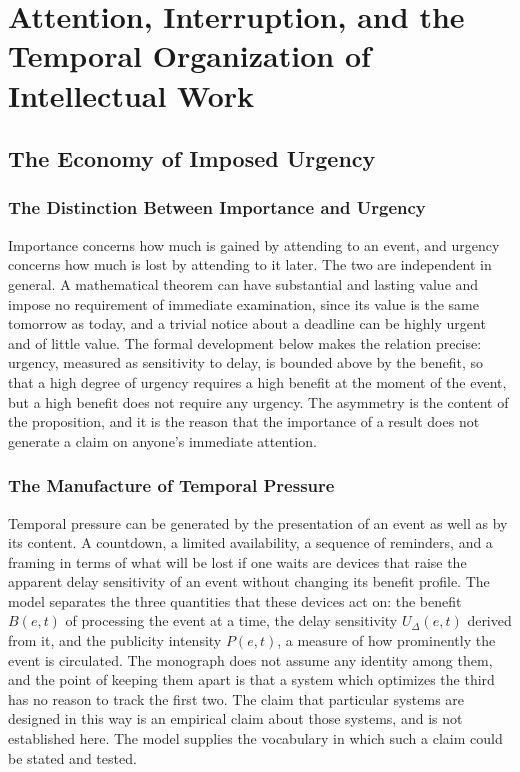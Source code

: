 \documentclass[11pt,letterpaper]{report}
\theoremstyle{plain}
\theoremstyle{definition}
\theoremstyle{remark}
\begin{document}
\part{Attention, Interruption, and the Temporal Organization of Intellectual Work}

\chapter{The Economy of Imposed Urgency}

\section{The Distinction Between Importance and Urgency}

Importance concerns how much is gained by attending to an event, and urgency concerns how much is lost by attending to it later. The two are independent in general. A mathematical theorem can have substantial and lasting value and impose no requirement of immediate examination, since its value is the same tomorrow as today, and a trivial notice about a deadline can be highly urgent and of little value. The formal development below makes the relation precise: urgency, measured as sensitivity to delay, is bounded above by the benefit, so that a high degree of urgency requires a high benefit at the moment of the event, but a high benefit does not require any urgency. The asymmetry is the content of the proposition, and it is the reason that the importance of a result does not generate a claim on anyone's immediate attention.

\section{The Manufacture of Temporal Pressure}

Temporal pressure can be generated by the presentation of an event as well as by its content. A countdown, a limited availability, a sequence of reminders, and a framing in terms of what will be lost if one waits are devices that raise the apparent delay sensitivity of an event without changing its benefit profile. The model separates the three quantities that these devices act on: the benefit $B(e,t)$ of processing the event at a time, the delay sensitivity $U_\Delta(e,t)$ derived from it, and the publicity intensity $P(e,t)$, a measure of how prominently the event is circulated. The monograph does not assume any identity among them, and the point of keeping them apart is that a system which optimizes the third has no reason to track the first two. The claim that particular systems are designed in this way is an empirical claim about those systems, and is not established here. The model supplies the vocabulary in which such a claim could be stated and tested.
\end{document}
